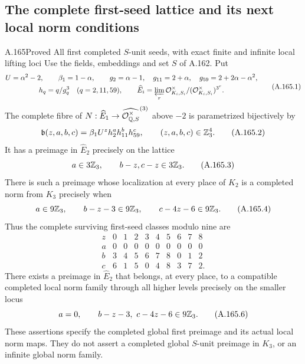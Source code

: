 \subsection{The complete first-seed lattice and its next local norm conditions}

\begin{statement}{A.165}{Proved}
{All first completed \(S\)-unit seeds, with exact finite and infinite local lifting loci}
Use the fields, embeddings and set \(S\) of A.162.  Put
\[
 \begin{gathered}
 U=\alpha^2-2,\qquad \beta_1=1-\alpha,\qquad
 g_2=\alpha-1,\quad g_{11}=2+\alpha,\quad
 g_{59}=2+2\alpha-\alpha^2,\\
 h_q=q/g_q^3\quad(q=2,11,59),\qquad
 \widehat E_i=\varprojlim_r
 \mathcal O_{K_i,S_i}^{\times}/
       (\mathcal O_{K_i,S_i}^{\times})^{3^r}.
 \end{gathered}
\tag{A.165.1}
\]
The complete fibre of \(N:\widehat E_1\to
\widehat{\mathcal O_{\mathbb Q,S}^{\times}}^{(3)}\) above \(-2\)
is parametrized bijectively by
\[
 \mathfrak b(z,a,b,c)=
       \beta_1 U^z h_2^a h_{11}^b h_{59}^c,
       \qquad(z,a,b,c)\in\mathbb Z_3^4.
\tag{A.165.2}
\]
It has a preimage in \(\widehat E_2\) precisely on the lattice
\[
                 a\in3\mathbb Z_3,\qquad b-z,c-z\in3\mathbb Z_3.
\tag{A.165.3}
\]
There is such a preimage whose localization at every place of \(K_2\)
is a completed norm from \(K_3\) precisely when
\[
        a\in9\mathbb Z_3,\qquad
        b-z-3\in9\mathbb Z_3,\qquad c-4z-6\in9\mathbb Z_3.
\tag{A.165.4}
\]
Thus the complete surviving first-seed classes modulo nine are
\[
\begin{array}{c|rrrrrrrrr}
z&0&1&2&3&4&5&6&7&8\\ \hline
a&0&0&0&0&0&0&0&0&0\\
b&3&4&5&6&7&8&0&1&2\\
c&6&1&5&0&4&8&3&7&2 .
\end{array}
\tag{A.165.5}
\]
There exists a preimage in \(\widehat E_2\) that belongs, at every
place, to a compatible completed local norm family through all higher
levels precisely on the smaller locus
\[
              a=0,\qquad
              b-z-3,\ c-4z-6\in9\mathbb Z_3.
\tag{A.165.6}
\]
These assertions specify the completed global first preimage and its
actual local norm maps.  They do not assert a completed global
\(S\)-unit preimage in \(K_3\), or an infinite global norm family.
\end{statement}

